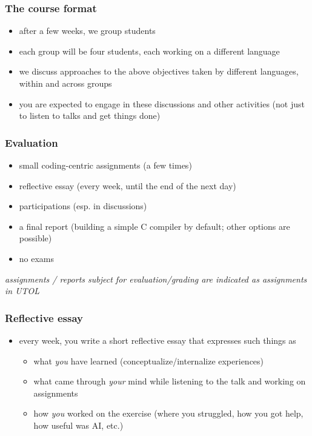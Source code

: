 \documentclass[12pt,dvipdfmx]{beamer}
\newcommand{\ao}[1]{{\color{blue}#1}}
\begin{document}
\begin{frame}
  \frametitle{The course format}
  \begin{itemize}
  \item after a few weeks, we group students
  \item each group will be four students, each working on a different language
  \item we discuss approaches to the above objectives
    taken by different languages,
    within and across groups
  \item you are expected to engage in these discussions and other activities
    (not just to listen to talks and get things done)
  \end{itemize}
\end{frame}

\begin{frame}
  \frametitle{Evaluation}
  \begin{itemize}
  \item small coding-centric assignments (a few times)
  \item reflective essay (every week, until the end of the next day)
  \item participations (esp. in discussions)
  \item a final report
    (building a simple C compiler by default; other options are possible)
  \item no exams
  \end{itemize}
  \ao{\it assignments / reports subject for evaluation/grading are indicated 
    as assignments in UTOL}
\end{frame}

\begin{frame}
  \frametitle{Reflective essay}
  \begin{itemize}
  \item every week, you write a short reflective essay that expresses
    such things as
    \begin{itemize}
    \item what \ao{\it you} have learned (conceptualize/internalize experiences)
    \item what came through \ao{\it your} mind while listening to the talk
      and working on assignments
    \item how \ao{\it you} worked on the exercise
      (where you struggled, how you got help, how useful was AI, etc.)
    \end{itemize}
  \end{itemize}
\end{frame}
\end{document}
